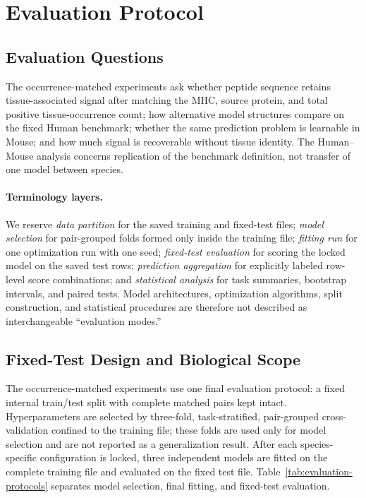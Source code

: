 \section{Evaluation Protocol}

\subsection{Evaluation Questions}

The occurrence-matched experiments ask whether peptide sequence retains tissue-associated signal after matching the MHC, source protein, and total positive tissue-occurrence count; how alternative model structures compare on the fixed Human benchmark; whether the same prediction problem is learnable in Mouse; and how much signal is recoverable without tissue identity. The Human--Mouse analysis concerns replication of the benchmark definition, not transfer of one model between species.

\paragraph{Terminology layers.}
We reserve \emph{data partition} for the saved training and fixed-test files; \emph{model selection} for pair-grouped folds formed only inside the training file; \emph{fitting run} for one optimization run with one seed; \emph{fixed-test evaluation} for scoring the locked model on the saved test rows; \emph{prediction aggregation} for explicitly labeled row-level score combinations; and \emph{statistical analysis} for task summaries, bootstrap intervals, and paired tests. Model architectures, optimization algorithms, split construction, and statistical procedures are therefore not described as interchangeable “evaluation modes.”

\subsection{Fixed-Test Design and Biological Scope}

The occurrence-matched experiments use one final evaluation protocol: a fixed internal train/test split with complete matched pairs kept intact. Hyperparameters are selected by three-fold, task-stratified, pair-grouped cross-validation confined to the training file; these folds are used only for model selection and are not reported as a generalization result. After each species-specific configuration is locked, three independent models are fitted on the complete training file and evaluated on the fixed test file. Table~\ref{tab:evaluation-protocols} separates model selection, final fitting, and fixed-test evaluation.

